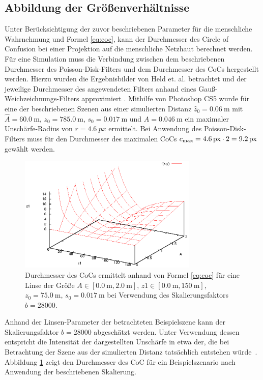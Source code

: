 \documentclass{acmsiggraph}                     %
\begin{document}
\subsection{Abbildung der Größenverhältnisse}
\label{sec:proportions}

Unter Berücksichtigung der zuvor beschriebenen Parameter für die menschliche Wahrnehmung und Formel \ref{eq:coc}, kann der Durchmesser des Circle of Confusion bei einer Projektion auf die menschliche Netzhaut berechnet werden. Für eine Simulation muss die Verbindung zwischen dem beschriebenen Durchmesser des Poisson-Disk-Filters und dem Durchmesser des CoCs hergestellt werden. Hierzu wurden die Ergebnisbilder von Held et. al. betrachtet und der jeweilige Durchmesser des angewendeten Filters anhand eines Gauß-Weichzeichnungs-Filters approximiert \cite{Held:2010cr}. Mithilfe von Photoshop CS5 wurde für eine der beschriebenen Szenen aus einer simulierten Distanz $\hat z_0 = \SI{0.06}{\meter}$ mit $\hat A = \SI{60.0}{\meter}$, $z_0 = \SI{785.0}{\meter}$, $s_0 = \SI{0.017}{\meter}$ und $A = \SI{0.046}{\meter}$ ein maximaler Unschärfe-Radius von $r = \SI{4.6}{px}$ ermittelt. Bei Anwendung des Poisson-Disk-Filters muss für den Durchmesser des maximalen CoCs $c_{\textnormal{max}} = \SI{4.6}{px} \cdot 2 = \SI{9.2}{px}$ gewählt werden.

\begin{figure}[htbp]
\centering
\includegraphics[width=3.35in]{DoF-Graph}
\caption{Durchmesser des CoCs ermittelt anhand von Formel \ref{eq:coc} für eine Linse der Größe $A \in [\SI{0.0}{\meter},\SI{2.0}{\meter}]$, $z1 \in [\SI{0.0}{\meter},\SI{150}{\meter}]$, $z_0 = \SI{75.0}{\meter}$, $s_0 =\SI{0.017}{\meter}$ bei Verwendung des Skalierungsfaktors $b = 28000$.}
\label{abb:cocgraph}
\end{figure}

Anhand der Linsen-Parameter der betrachteten Beispielszene kann der Skalierungsfaktor $b = 28000$ abgeschätzt werden. Unter Verwendung dessen entspricht die Intensität der dargestellten Unschärfe in etwa der, die bei Betrachtung der Szene aus der simulierten Distanz tatsächlich entstehen würde~\cite{Held:2010cr}. Abbildung \ref{abb:cocgraph} zeigt den Durchmesser des CoC für ein Beispielszenario nach Anwendung der beschriebenen Skalierung.
\end{document}
